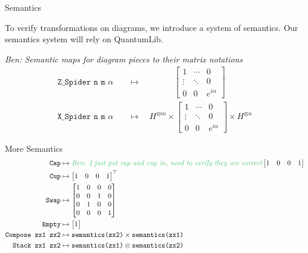 \documentclass{beamer}
\newcommand{\ben}[1]{\textit{\textcolor{egreen}{Ben: #1}}}
\newcommand{\ben}[1]{}
\begin{document}
\begin{frame}{Semantics}

    To verify transformations on diagrams, we introduce a system of semantics. Our semantics system will rely on QuantumLib.
    
    \ben{Semantic maps for diagram pieces to their matrix notations}
    \begin{align*}
        \texttt{Z_Spider n m }\alpha \quad &\mapsto \hspace{47pt}
        \begin{bmatrix} 
            1 & \dotsi & 0 \\ 
            \vdots & \ddots & 0 \\ 
            0 & 0 & e^{i\alpha}
        \end{bmatrix}
    \\
    \texttt{X_Spider n m }\alpha  \quad &\mapsto \quad H^{\otimes m} \times 
        \begin{bmatrix} 
            1 & \dotsi & 0 \\ 
            \vdots & \ddots & 0 \\ 
            0 & 0 & e^{i\alpha}
        \end{bmatrix} \times H^{\otimes n}
    \end{align*}
\end{frame}
    
\begin{frame}{More Semantics}
    \begin{align*}
        \texttt{Cap} &\mapsto \ben{I just put cap and cup in, need to verify they are correct}
        \begin{bmatrix} 
            1 & 0 & 0 & 1
        \end{bmatrix}
    \\
        \texttt{Cup} &\mapsto 
        \begin{bmatrix} 
            1 & 0 & 0 & 1
        \end{bmatrix}^\top
    \\
        \texttt{Swap} &\mapsto
        \begin{bmatrix}
            1 & 0 & 0 & 0 \\
            0 & 0 & 1 & 0 \\
            0 & 1 & 0 & 0 \\
            0 & 0 & 0 & 1
        \end{bmatrix}
    \\
        \texttt{Empty} &\mapsto
        \begin{bmatrix}
            1
        \end{bmatrix}
    \\        
        \texttt{Compose zx1 zx2} &\mapsto 
        \texttt{semantics(zx2)} \times \texttt{semantics(zx1)}
    \\
        \texttt{Stack zx1 zx2} &\mapsto
        \texttt{semantics(zx1)} \otimes \texttt{semantics(zx2)}
    \end{align*}
\end{frame}
\end{document}
